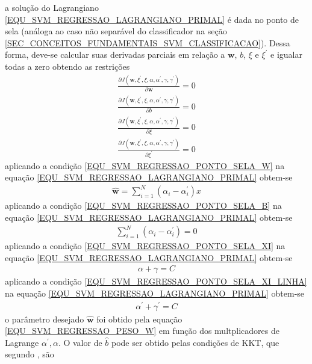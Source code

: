 a solução do Lagrangiano \eqref{EQU_SVM_REGRESSAO_LAGRANGIANO_PRIMAL} é dada no ponto de sela (análoga ao caso não separável do classificador na seção \ref{SEC_CONCEITOS_FUNDAMENTAIS_SVM_CLASSIFICACAO}). Dessa forma, deve-se calcular suas derivadas parciais em relação a \(\mathbf{w}\), \(b\), \(\xi\) e \(\xi^{'}\) e igualar todas a zero \cite{Haykin2007} obtendo as restrições
\begin{align}
\frac{\partial J(\mathbf{w}, \xi^{'}, \xi, \alpha, \alpha^{'}, \gamma, \gamma^{'})}{\partial \mathbf{w}} = 0	\label{EQU_SVM_REGRESSAO_PONTO_SELA_W}\\
\frac{\partial J(\mathbf{w}, \xi^{'}, \xi, \alpha, \alpha^{'}, \gamma, \gamma^{'})}{\partial b} = 0  	\label{EQU_SVM_REGRESSAO_PONTO_SELA_B}\\
\frac{\partial J(\mathbf{w}, \xi^{'}, \xi, \alpha, \alpha^{'}, \gamma, \gamma^{'})}{\partial \xi} = 0	\label{EQU_SVM_REGRESSAO_PONTO_SELA_XI}\\
\frac{\partial J(\mathbf{w}, \xi^{'}, \xi, \alpha, \alpha^{'}, \gamma, \gamma^{'})}{\partial \xi^{'}} = 0  	\label{EQU_SVM_REGRESSAO_PONTO_SELA_XI_LINHA}
\end{align}
aplicando a condição \eqref{EQU_SVM_REGRESSAO_PONTO_SELA_W} na equação \eqref{EQU_SVM_REGRESSAO_LAGRANGIANO_PRIMAL} obtem-se 
\begin{align}
\mathbf{\hat{w}} = \sum\limits_{i=1}^{N} (\alpha_{i} - \alpha^{'}_{i})x \label{EQU_SVM_REGRESSAO_PESO_W}
\end{align}
aplicando a condição \eqref{EQU_SVM_REGRESSAO_PONTO_SELA_B} na equação \eqref{EQU_SVM_REGRESSAO_LAGRANGIANO_PRIMAL} obtem-se 
\begin{align}
\sum\limits_{i=1}^{N} (\alpha_{i} - \alpha^{'}_{i}) = 0
\end{align}
aplicando a condição \eqref{EQU_SVM_REGRESSAO_PONTO_SELA_XI} na equação \eqref{EQU_SVM_REGRESSAO_LAGRANGIANO_PRIMAL} obtem-se 
\begin{align}
\alpha + \gamma = C
\end{align}
aplicando a condição \eqref{EQU_SVM_REGRESSAO_PONTO_SELA_XI_LINHA} na equação \eqref{EQU_SVM_REGRESSAO_LAGRANGIANO_PRIMAL} obtem-se 
\begin{align}
\alpha^{'} + \gamma^{'} = C
\end{align}
\noindent
o parâmetro desejado \(\mathbf{\hat{w}}\) foi obtido pela equação \eqref{EQU_SVM_REGRESSAO_PESO_W} em função dos multplicadores de Lagrange \(\alpha^{'}, \alpha\). O valor de \(\hat{b}\) pode ser obtido pelas condições de KKT, que segundo , são
